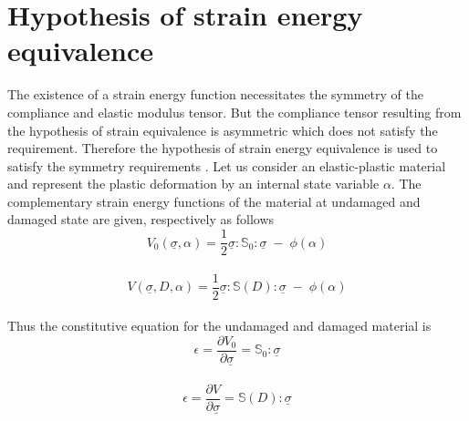 \documentclass[12pt,a4paper,twoside,openright]{report}
\begin{document}
\section{Hypothesis of strain energy equivalence}\label{Hypothesis of strain energy equivalence}
\indent\indent\indent The existence of a strain energy function necessitates the symmetry of the compliance and elastic modulus tensor. But the compliance tensor resulting from the hypothesis of strain equivalence is asymmetric which does not satisfy the requirement. Therefore the hypothesis of strain energy equivalence is used to satisfy the symmetry requirements \citep{cordebois1982damage}. Let us consider an elastic-plastic material and represent the plastic deformation by an internal state variable $\alpha$. The complementary strain energy functions of the material at undamaged and damaged state are given, respectively as follows
\\
\begin{equation}
V_{0}(\underline{\sigma},\alpha) = \frac{1}{2}\underline{\sigma} : \mathbb{S}_{0} : \underline{\sigma} \; - \; \phi(\alpha)
\end{equation}
\\
\begin{equation}
V(\underline{\sigma},D,\alpha) = \frac{1}{2}\underline{\sigma}: \mathbb{S}(D) : \underline{\sigma} \; - \; \phi(\alpha)
\end{equation}
\\
Thus the constitutive equation for the undamaged and damaged material is 
\\
\begin{equation}
\epsilon = \frac{\partial V_{0} }{\partial \underline{\sigma}} = \mathbb{S}_{0} : \underline{\sigma}
\end{equation}
\\
\begin{equation}
\epsilon = \frac{\partial V }{\partial \underline{\sigma}} = \mathbb{S}(D) : \underline{\sigma}
\label{eqn:Strain_energy_eq}
\end{equation}
\end{document}
